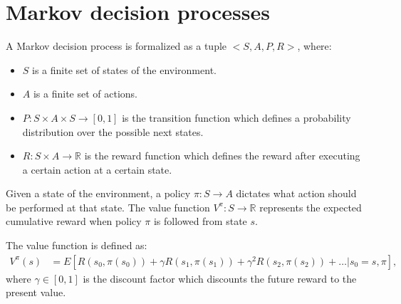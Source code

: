 

\section{Markov decision processes}
\label{se:MDP}

\begin{definition} A Markov decision process is formalized as a tuple $<S, A, P, R>$, where:
\begin{itemize}
    \item $S$ is a finite set of states of the environment.
    \item $A$ is a finite set of actions.
    \item $P:S \times A \times S \rightarrow [0, 1]$ is the transition function which defines a probability distribution over the possible next states.
    \item $R:S \times A \rightarrow \mathbb{R}$ is the reward function which defines the reward after executing a certain action at a certain state.
 \end{itemize}
\end{definition}

Given a state of the environment, a policy $\pi: S \rightarrow A$ dictates what action should be performed at that state. 
The value function $V^{\pi}: S \rightarrow \mathbb{R}$ represents the expected cumulative reward when 
policy $\pi$ is followed from state $s$.

The value function is defined as:
\begin{align}
    V^{\pi}(s) &= E[R(s_0, \pi(s_0)) + \gamma R(s_1, \pi(s_1)) + \gamma^2 R(s_2, \pi(s_2)) + \dots | s_0 = s, \pi],
    \label{eq:defV}
\end{align}
where $\gamma \in [0, 1]$ is the discount factor which discounts the future reward to the present value.

